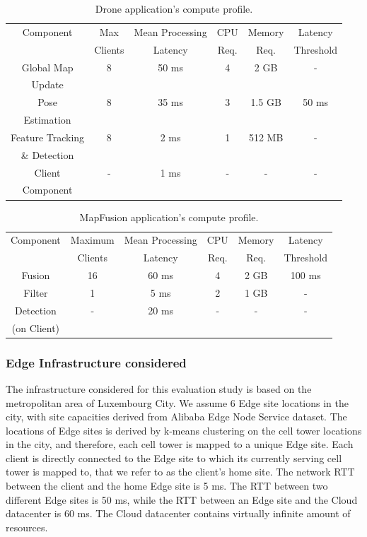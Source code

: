 \begin{table}[h!]
\centering
\caption{Drone application's compute profile.}
\label{table:drone_profile}
\begin{tabular}{||c | c | c | c | c | c ||} 
 \hline
 Component & Max & Mean Processing  & CPU & Memory & Latency  \\
 & Clients & Latency & Req. & Req. & Threshold \\
 \hline\hline
 Global Map & 8 & 50 ms & 4 & 2 GB & - \\
 Update & & & & & \\
 \hline
 Pose & 8 & 35 ms & 3 & 1.5 GB & 50 ms \\ 
 Estimation & & & & & \\
 \hline
 Feature Tracking & 8 & 2 ms & 1 & 512 MB & - \\
 \& Detection & & & & & \\
 \hline
 Client & - & 1 ms & - & - & - \\
 Component & & & & & \\
 \hline
\end{tabular}
\end{table}

\begin{table}[h!]
\centering
\caption{MapFusion application's compute profile.}
\label{table:mapfusion_profile}
\begin{tabular}{||c | c | c | c | c | c ||} 
 \hline
 Component & Maximum & Mean Processing  & CPU & Memory & Latency  \\
 & Clients & Latency & Req. & Req. & Threshold \\
 \hline\hline
 Fusion & 16 & 60 ms & 4 & 2 GB & 100 ms \\
 \hline
 Filter & 1 & 5 ms & 2 & 1 GB & - \\ 
 \hline
 Detection & - & 20 ms & - & - & - \\
 (on Client) & & & & & \\
 \hline
\end{tabular}
\end{table}

\subsubsection{Edge Infrastructure considered}
The infrastructure considered for this evaluation study is based on the metropolitan area of Luxembourg City. We assume 6 Edge site locations in the city, with site capacities derived from Alibaba Edge Node Service dataset. The locations of Edge sites is derived by k-means clustering on the cell tower locations in the city, and therefore, each cell tower is mapped to a unique Edge site. Each client is directly connected to the Edge site to which its currently serving cell tower is mapped to, that we refer to as the client's home site. The network RTT between the client and the home Edge site is 5 ms. The RTT between two different Edge sites is 50 ms, while the RTT between an Edge site and the Cloud datacenter is 60 ms. The Cloud datacenter contains virtually infinite amount of resources.

